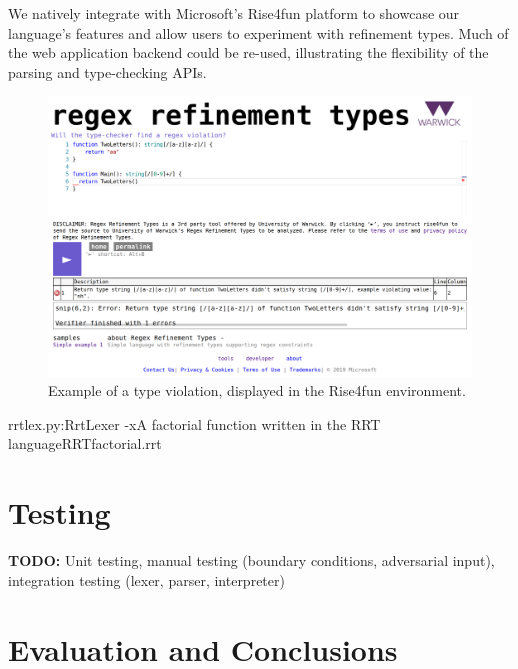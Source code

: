 \documentclass[a4paper,openany,12pt]{book}
\newcommand{\todobox}[1] {\colorbox{todocolor}{\parbox{\dimexpr \linewidth-\columnsep}{\vspace{.75\baselineskip}\centering\parbox{0.95\linewidth}{\faIcon{lightbulb} \textbf{TODO:} #1\vspace{.75\baselineskip}}}}}
\begin{document}
We natively integrate with Microsoft's Rise4fun platform to showcase our language's features and allow users to
experiment with refinement types.
Much of the web application backend could be re-used, illustrating the flexibility of the parsing and type-checking
APIs.

\begin{figure}[H]
    \begin{MyMdframed}
        \vspace{0.5em}
        
        
        \caption{\label{figure:r4f}Example of a type violation, displayed in the Rise4fun environment.}
        \vspace{0.5em}
        \captionsetup{style=default}
        
        \centering \includegraphics[width=0.9\linewidth]{rise4fun.png}
    \end{MyMdframed}
\end{figure}




\begin{mycodefile}{rrtlex.py:RrtLexer -x}{\label{code:rrt:1}A factorial function written in the RRT language}{RRT}{factorial.rrt}
    \vspace{0.5em}
\end{mycodefile}

\chapter{Testing}

\todobox{Unit testing, manual testing (boundary conditions, adversarial input), integration testing (lexer, parser, interpreter)}

\chapter{Evaluation and Conclusions}
\end{document}
